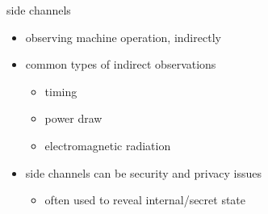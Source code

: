 \begin{frame}{side channels}
\begin{itemize}
\item observing machine operation, indirectly
\item common types of indirect observations
    \begin{itemize}
    \item timing
    \item power draw
    \item electromagnetic radiation
    \end{itemize}
\item side channels can be security and privacy issues
    \begin{itemize}
    \item often used to reveal internal/secret state
    \end{itemize}
\end{itemize}
\end{frame}